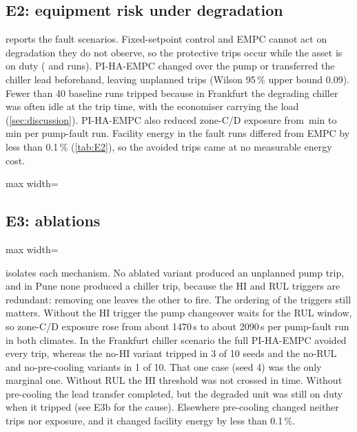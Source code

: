 \documentclass[preprint,12pt,authoryear]{elsarticle}
\begin{document}
\subsection{E2: equipment risk under degradation}
 reports the fault scenarios. Fixed-setpoint control and EMPC cannot act on degradation they do not observe, so the protective trips occur while the asset is on duty (\EtwoTripsFixed{} and \EtwoTripsEmpc{} runs). PI-HA-EMPC changed over the pump or transferred the chiller lead beforehand, leaving \EtwoTripsHa{} unplanned trips (Wilson 95\,\% upper bound 0.09). Fewer than 40 baseline runs tripped because in Frankfurt the degrading chiller was often idle at the trip time, with the economiser carrying the load (\cref{sec:discussion}). PI-HA-EMPC also reduced zone-C/D exposure from \EtwoRiskEmpc\,min to \EtwoRiskHa\,min per pump-fault run. Facility energy in the fault runs differed from EMPC by less than 0.1\,\% (\cref{tab:E2}), so the avoided trips came at no measurable energy cost.
\begin{table}[t]\centering\scriptsize
\caption{E2: fault scenarios (trip rate with Wilson 95\,\% CI; other columns mean [95\,\% CI]).}\label{tab:E2}
\begin{adjustbox}{max width=\linewidth}\end{adjustbox}
\end{table}

\subsection{E3: ablations}
\begin{table}[t]\centering\scriptsize
\caption{E3: ablations over both fault scenarios and climates (diurnal workload).}\label{tab:E3}
\begin{adjustbox}{max width=\linewidth}\end{adjustbox}
\end{table}
 isolates each mechanism. No ablated variant produced an unplanned pump trip, and in Pune none produced a chiller trip, because the HI and RUL triggers are redundant: removing one leaves the other to fire. The ordering of the triggers still matters. Without the HI trigger the pump changeover waits for the RUL window, so zone-C/D exposure rose from about 1470\,s to about 2090\,s per pump-fault run in both climates. In the Frankfurt chiller scenario the full PI-HA-EMPC avoided every trip, whereas the no-HI variant tripped in 3 of 10 seeds and the no-RUL and no-pre-cooling variants in 1 of 10. That one case (seed 4) was the only marginal one. Without RUL the HI threshold was not crossed in time. Without pre-cooling the lead transfer completed, but the degraded unit was still on duty when it tripped (see E3b for the cause). Elsewhere pre-cooling changed neither trips nor exposure, and it changed facility energy by less than 0.1\,\%.
\end{document}
